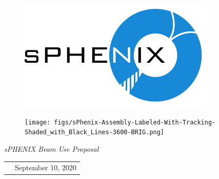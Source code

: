 \renewcommand*\familydefault{\sfdefault}
{\sffamily
\vfill
\vspace{4cm}
\begin{figure}[H]
  \begin{center}
  \includegraphics[width=0.4\linewidth]{figs/sPHENIX}
  \end{center}
\end{figure}

\vfill

\begin{figure}[htpb]
\begin{center}
\texttt{[image: figs/sPhenix-Assembly-Labeled-With-Tracking-Shaded\_with\_Black\_Lines-3600-BRIG.png]}
\end{center}
\end{figure}


\vspace{2cm}

\begin{center}
  \large
  \emph{\Large{sPHENIX Beam Use Proposal}}

  \begin{tabular}{rl}
  &September 10, 2020 \\
  \end{tabular}
\end{center}
}



\renewcommand*\familydefault{\rmdefault}
